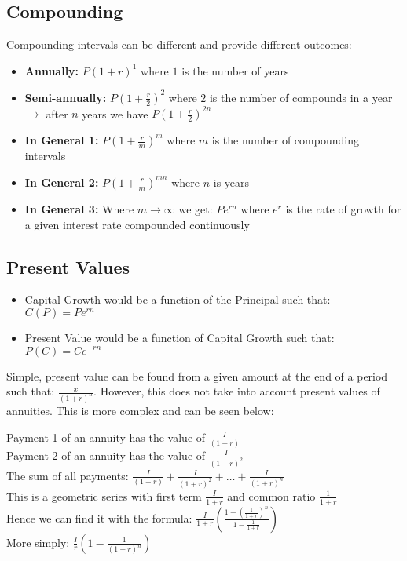 \documentclass[12pt, letterpaper]{article}
\begin{document}
\subsection{Compounding}
Compounding intervals can be different and provide different outcomes:
\begin{itemize}
	\item \textbf{Annually:} $P(1+r)^1$ where $1$ is the number of years
	\item \textbf{Semi-annually:} $P(1+\frac{r}{2})^2$ where $2$ is the number of compounds in a year $\rightarrow$ after $n$ years we have $P(1+\frac{r}{2})^{2n}$
	\item \textbf{In General 1:} $P(1+\frac{r}{m})^m$ where $m$ is the number of compounding intervals
	\item \textbf{In General 2:} $P(1+\frac{r}{m})^{mn}$ where $n$ is years
	\item \textbf{In General 3:} Where $m \rightarrow \infty$ we get: $Pe^{rn}$ where $e^r$ is the rate of growth for a given interest rate compounded continuously
\end{itemize}

\subsection{Present Values}
\begin{itemize}
	\item Capital Growth would be a function of the Principal such that: $C(P) = Pe^{rn}$
	\item Present Value would be a function of Capital Growth such that: $P(C) = Ce^{-rn}$
\end{itemize}
Simple, present value can be found from a given amount at the end of a period such that: $\frac{x}{(1+r)^n}$.
However, this does not take into account present values of annuities. This is more complex and can be seen below:
\begin{center}
	Payment 1 of an annuity has the value of $\frac{I}{(1+r)}$\\
	Payment 2 of an annuity has the value of $\frac{I}{(1+r)^2}$\\
	The sum of all payments: $\frac{I}{(1+r)}+\frac{I}{(1+r)^2}+\dots + \frac{I}{(1+r)^n}$\\
	This is a geometric series with first term $\frac{I}{1+r}$ and common ratio $\frac{1}{1+r}$\\
	Hence we can find it with the formula: $\frac{I}{1+r}(\frac{1-(\frac{1}{1+r})^n}{1-\frac{1}{1+r}})$\\
	More simply: $\frac{I}{r}(1-\frac{1}{(1+r)^n})$
\end{center}
\end{document}
